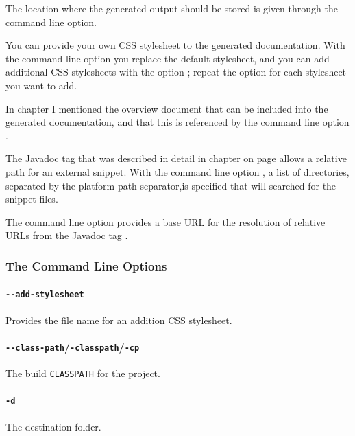 The location where the generated output should be stored is given through the \mbox{} command line option.

You can provide your own CSS stylesheet to the generated documentation. With the command line option \mbox{} you replace the default stylesheet, and you can add additional CSS stylesheets with the option \mbox{}; repeat the option for each stylesheet you want to add.

In chapter  I mentioned the overview document that can be included into the generated documentation, and that this is referenced by the command line option \mbox{}.

The Javadoc tag  that was described in detail in chapter  on page \pageref{sec:JavaDocSnippetTag} allows a relative path for an external snippet. With the command line option \mbox{}, a list of directories, separated by the platform path separator,is specified that will searched for the snippet files.

The command line option \mbox{} provides a base URL for the resolution of relative URLs from the Javadoc tag . 

\subsubsection{The Command Line Options}

\paragraph{\texttt{-{}-add-stylesheet}} Provides the file name for an addition CSS stylesheet.

\paragraph{\texttt{-{}-class-path}/\texttt{-classpath}/\texttt{-cp}} The build \texttt{CLASSPATH} for the project.

\paragraph{\texttt{-d}} The destination folder.

